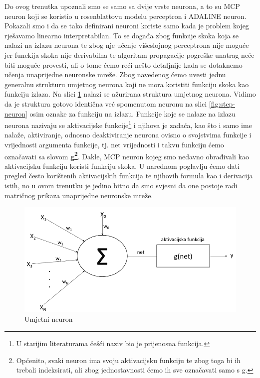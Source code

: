 \documentclass[times, utf8, zavrsni]{fer}
\begin{document}
Do ovog trenutka upoznali smo se samo sa dvije vrste neurona, a to su MCP neuron koji se koristio u rosenblattovu modelu perceptron i ADALINE neuron. Pokazali smo i da se tako definirani neuroni koriste samo kada je problem kojeg rješavamo linearno interpretabilan. To se događa zbog funkcije skoka koja se nalazi na izlazu neurona te zbog nje učenje višeslojnog perceptrona nije moguće jer funckija skoka nije derivabilna te algoritam propagacije pogreške unatrag neće biti moguće provesti, ali o tome ćemo reći nešto detaljnije kada se dotaknemo učenja unaprijedne neuronske mreže. Zbog navedenog ćemo uvesti jednu generalnu strukturu umjetnog neurona koji ne mora koristiti funkciju skoka kao funkciju izlaza. Na slici \ref{fig:ai-neuron} nalazi se ažurirana struktura umjetnog neurona. Vidimo da je struktura gotovo identična već spomenutom neuronu na slici \ref{fig:step-neuron} osim oznake za funkciju na izlazu. Funkcije koje se nalaze na izlazu neurona nazivaju se aktivacijske funkcije\footnote{U starijim literaturama češći naziv bio je prijenosna funkcija.} i njihova je zadaća, kao što i samo ime nalaže, aktiviranje, odnosno deaktiviranje neurona ovisno o svojstvima funkcije i vrijednosti argumenta funkcije, tj. net vrijednosti i takvu funkciju ćemo označavati sa slovom \textbf{g\footnote{Općenito, svaki neuron ima svoju aktivacijsku funkciju te zbog toga bi ih trebali indeksirati, ali zbog jednostavnosti ćemo ih sve označavati samo s g.}}. Dakle, MCP neuron kojeg smo nedavno obrađivali kao aktivacijsku funkciju koristi funkciju skoka. U narednom poglavlju ćemo dati pregled često korištenih aktivacijskih funkcija te njihovih formula kao i derivacija istih, no u ovom trenutku je jedino bitno da smo svjesni da one postoje radi matričnog prikaza unaprijedne neuronske mreže.

\begin{figure}[H]
    \centering
    \includegraphics[scale=0.6]{img/ai-neuron.png}
    \caption[Caption for LOF]{Umjetni neuron\footnotemark}
    \label{fig:ai-neuron}
\end{figure}
\end{document}
